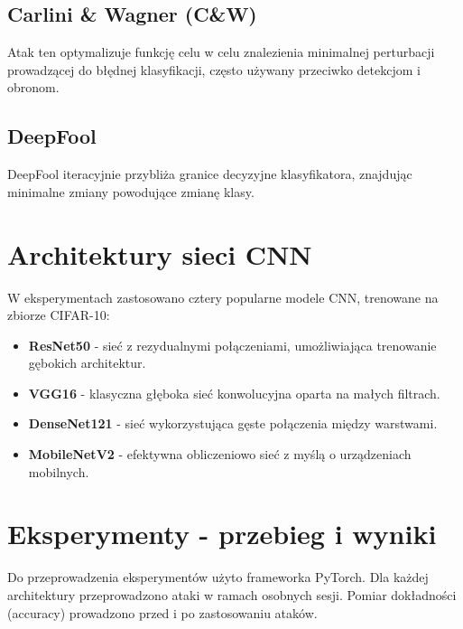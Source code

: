 \documentclass{article}
\begin{document}
\subsection{Carlini \& Wagner (C\&W)}
Atak ten \cite{carlini2017towards} optymalizuje funkcję celu w celu znalezienia minimalnej perturbacji prowadzącej do błędnej klasyfikacji, często używany przeciwko detekcjom i obronom.

\subsection{DeepFool}
DeepFool \cite{moosavi2016deepfool} iteracyjnie przybliża granice decyzyjne klasyfikatora, znajdując minimalne zmiany powodujące zmianę klasy.

\section{Architektury sieci CNN}
W eksperymentach zastosowano cztery popularne modele CNN, trenowane na zbiorze CIFAR-10:
\begin{itemize}
    \item \textbf{ResNet50} \cite{he2016deep} - sieć z rezydualnymi połączeniami, umożliwiająca trenowanie gębokich architektur.
    \item \textbf{VGG16} \cite{simonyan2014very} - klasyczna głęboka sieć konwolucyjna oparta na małych filtrach.
    \item \textbf{DenseNet121} \cite{huang2017densely} - sieć wykorzystująca gęste połączenia między warstwami.
    \item \textbf{MobileNetV2} \cite{sandler2018mobilenetv2} - efektywna obliczeniowo sieć z myślą o urządzeniach mobilnych.
\end{itemize}

\section{Eksperymenty - przebieg i wyniki}
Do przeprowadzenia eksperymentów użyto frameworka PyTorch. Dla każdej architektury przeprowadzono ataki w ramach osobnych sesji. Pomiar dokładności (accuracy) prowadzono przed i po zastosowaniu ataków.
\end{document}
